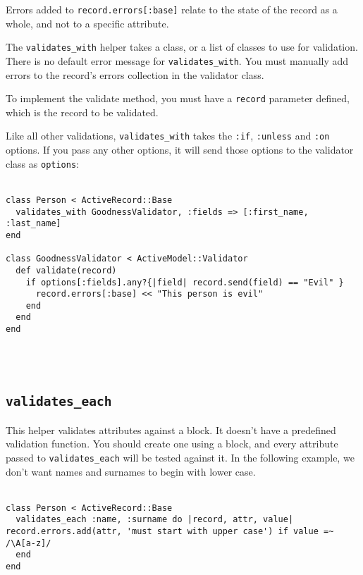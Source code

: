 \documentclass[10pt]{book}
\begin{document}
Errors added to \texttt{record.errors[:base]} relate to the state of the record as a whole, and not to a specific attribute.

The \texttt{validates\_with} helper takes a class, or a list of classes to use for validation. There is no default error message for \texttt{validates\_with}. You must manually add errors to the record’s errors collection in the validator class.

To implement the validate method, you must have a \texttt{record} parameter defined, which is the record to be validated.

Like all other validations, \texttt{validates\_with} takes the \texttt{:if}, \texttt{:unless} and \texttt{:on} options. If you pass any other options, it will send those options to the validator class as \texttt{options}:
\\ \\
\begin{minipage}{\textwidth}{\scriptsize
\begin{verbatim}
class Person < ActiveRecord::Base
  validates_with GoodnessValidator, :fields => [:first_name, :last_name]
end
 
class GoodnessValidator < ActiveModel::Validator
  def validate(record)
    if options[:fields].any?{|field| record.send(field) == "Evil" }
      record.errors[:base] << "This person is evil"
    end
  end
end
\end{verbatim}}
\end{minipage}
\\ \\
\subsection{ \texttt{validates\_each}}

This helper validates attributes against a block. It doesn’t have a  predefined validation function. You should create one using a block, and  every attribute passed to \texttt{validates\_each} will be tested against it. In the following example, we don’t want names and surnames to begin with lower case.
\\ \\
\begin{minipage}{\textwidth}{\scriptsize
\begin{verbatim}
class Person < ActiveRecord::Base
  validates_each :name, :surname do |record, attr, value|
record.errors.add(attr, 'must start with upper case') if value =~ /\A[a-z]/
  end
end
\end{verbatim}}
\end{minipage}
\\ \\
\end{document}
